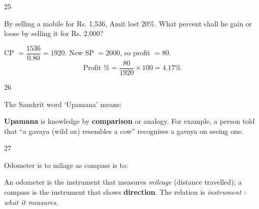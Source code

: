 \begin{question}{25}
{By selling a mobile for Rs. 1,536, Amit lost 20\%. What percent shall he gain or loose by selling it for Rs. 2,000?\par}
\begin{explain}
CP $=\dfrac{1536}{0.80}=1920$. New SP $=2000$, so profit $=80$.
\[\text{Profit \%}=\frac{80}{1920}\times100=\mathbf{4.17\%}\]
\end{explain}
\end{question}

\begin{question}{26}
{The Sanskrit word `Upamana' means:\par}
\begin{explain}
\textbf{Upamana} is knowledge by \textbf{comparison} or analogy. For example, a person told that ``a gavaya (wild ox) resembles a cow'' recognises a gavaya on seeing one.
\end{explain}
\end{question}

\begin{question}{27}
{Odometer is to milage as compass is to:\par}
\begin{explain}
An odometer is the instrument that measures \emph{mileage} (distance travelled); a compass is the instrument that shows \textbf{direction}. The relation is \emph{instrument : what it measures}.
\end{explain}
\end{question}

